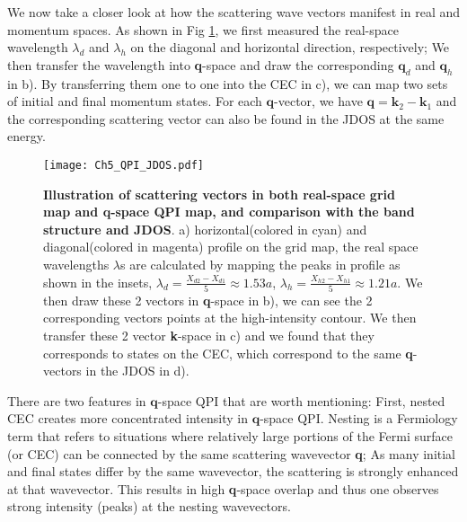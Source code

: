 We now take a closer look at how the scattering wave vectors manifest in real and momentum spaces. As shown in Fig \ref{fig:ch5_compare}, we first measured the real-space wavelength $\lambda_d$ and $\lambda_h$ on the diagonal and horizontal direction, respectively; We then transfer the wavelength into \textbf{q}-space and draw the corresponding $\textbf{q}_d$ and $\textbf{q}_h$ in b). By transferring them one to one into the \ac{CEC} in c), we can map two sets of initial and final momentum states. For each $\textbf{q}$-vector, we have $\textbf{q} = \textbf{k}_2 - \textbf{k}_1$ and the corresponding scattering vector can also be found in the \ac{JDOS} at the same energy. 
\begin{figure}
	\texttt{[image: Ch5\_QPI\_JDOS.pdf]} 
	\centering
	\caption[\textbf{Illustration of scattering vectors in both real-space grid map and \textbf{q}-space QPI map, and comparison with the band structure and JDOS}]{\textbf{Illustration of scattering vectors in both real-space grid map and \textbf{q}-space QPI map, and comparison with the band structure and JDOS}. a) horizontal(colored in cyan) and diagonal(colored in magenta) profile on the grid map, the real space wavelengths $\lambda$s are calculated by mapping the peaks in profile as shown in the insets, $\lambda_d = \frac{X_{d2}-X_{d1}}{5} \approx 1.53 a$, $\lambda_h = \frac{X_{h2}-X_{h1}}{5} \approx 1.21 a$. We then draw these 2 vectors in \textbf{q}-space in b), we can see the 2 corresponding vectors points at the high-intensity contour. We then transfer these 2 vector \textbf{k}-space in c) and we found that they corresponds to states on the \ac{CEC}, which correspond to the same \textbf{q}-vectors in the \ac{JDOS} in d).}
	\label{fig:ch5_compare}
\end{figure}

There are two features in $\textbf{q}$-space \ac{QPI} that are worth mentioning: First, nested \ac{CEC} creates more concentrated intensity in $\textbf{q}$-space \ac{QPI}. Nesting is a Fermiology term that refers to situations where relatively large portions of the Fermi surface (or \ac{CEC}) can be connected by the same scattering wavevector \textbf{q}; As many initial and final states differ by the same wavevector, the scattering is strongly enhanced at that wavevector. This results in high \textbf{q}‐space overlap and thus one observes strong intensity (peaks) at the nesting wavevectors. 

